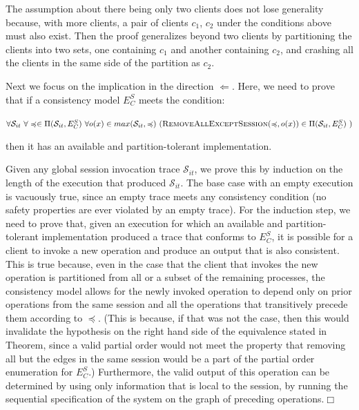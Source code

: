 \documentclass[conference]{IEEEtran}
\begin{document}
	The assumption about there being only two clients does not lose generality because, with more clients, a pair of clients $c_1$, $c_2$ under the conditions above must also exist. Then the proof generalizes beyond two clients by partitioning the clients into two sets, one containing $c_1$ and another containing $c_2$, and crashing all the clients in the same side of the partition as $c_2$.
	
	Next we focus on the implication in the direction $\Leftarrow$. Here, we need to prove that if a consistency model $E^S_C$ meets the condition:
	
	\noindent $\forall \mathcal{S}_{it} ~ \forall \preccurlyeq \in \Pi(\mathcal{S}_{it},E^S_C) ~ \forall o(x) \in max(\mathcal{S}_{it}, \preccurlyeq) ~ (\textsc{RemoveAllExceptSession}(\preccurlyeq,o(x)) \in \Pi(\mathcal{S}_{it},E^S_C) ~ ) $
	
	then it has an available and partition-tolerant implementation.
	
	
	
	Given any global session invocation trace $\mathcal{S}_{it}$, we prove this by induction on the length of the execution that produced $\mathcal{S}_{it}$. The base case with an empty execution is vacuously true, since an empty trace meets any consistency condition (no safety properties are ever violated by an empty trace). For the induction step, we need to prove that, given an execution for which an available and partition-tolerant implementation produced a trace that conforms to $E^S_C$, it is possible for a client to invoke a new operation and produce an output that is also consistent. This is true because, even in the case that the client that invokes the new operation is partitioned from all or a subset of the remaining processes, the consistency model allows for the newly invoked operation to depend only on prior operations from the same session and all the operations that transitively precede them according to $\preccurlyeq$. (This is because, if that was not the case, then this would invalidate the hypothesis on the right hand side of the equivalence stated in Theorem, since a valid partial order would not meet the property that removing all but the edges in the same session would be a part of the partial order enumeration for $E^S_C$.)  Furthermore, the valid output of this operation can be determined by using only information that is local to the session, by running the sequential specification of the system on the graph of preceding operations.$\Box$
	
	
\end{document}
